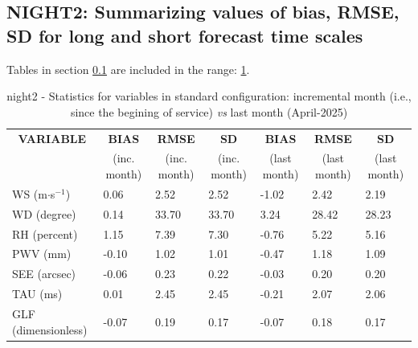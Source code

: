 \subsection{NIGHT2: Summarizing values of bias, RMSE, SD for long and short forecast time scales}\label{subsec:night2:stat}
Tables in section \ref{subsec:night2:stat} are included in the range: \ref{tab:night2:statBEF}.
\begin{table}[h!]
\begin{center}
\begin{tabular}{|l|l|l|l|l|l|l|}
\hline
\multicolumn{1}{|c|}{\cellcolor[HTML]{C0C0C0}\textbf{VARIABLE}} & \multicolumn{1}{c|}{\cellcolor[HTML]{C0C0C0}\textbf{BIAS}} & \multicolumn{1}{c|}{\cellcolor[HTML]{C0C0C0}\textbf{RMSE}} & \multicolumn{1}{c|}{\cellcolor[HTML]{C0C0C0}\textbf{SD}} & \multicolumn{1}{c|}{\cellcolor[HTML]{C0C0C0}\textbf{BIAS}} & \multicolumn{1}{c|}{\cellcolor[HTML]{C0C0C0}\textbf{RMSE}} & \multicolumn{1}{c|}{\cellcolor[HTML]{C0C0C0}\textbf{SD}}\\
\multicolumn{1}{|c|}{\cellcolor[HTML]{C0C0C0}} & \multicolumn{1}{c|}{\cellcolor[HTML]{C0C0C0}(inc. month)} & \multicolumn{1}{c|}{\cellcolor[HTML]{C0C0C0}(inc. month)} & \multicolumn{1}{c|}{\cellcolor[HTML]{C0C0C0}(inc. month)} & \multicolumn{1}{c|}{\cellcolor[HTML]{C0C0C0}(last month)} & \multicolumn{1}{c|}{\cellcolor[HTML]{C0C0C0}(last month)} & \multicolumn{1}{c|}{\cellcolor[HTML]{C0C0C0}(last month)}\\\hline
\cellcolor[HTML]{C0C0C0}WS (m$\cdot$s$^{-1}$) &      0.06  &      2.52  &      2.52  &     -1.02     &      2.42     &      2.19\\
\cellcolor[HTML]{C0C0C0}WD (degree)           &      0.14  &     33.70  &     33.70  &      3.24     &     28.42     &     28.23\\
\cellcolor[HTML]{C0C0C0}RH (percent)          &      1.15  &      7.39  &      7.30  &     -0.76     &      5.22     &      5.16\\
\cellcolor[HTML]{C0C0C0}PWV (mm)              &     -0.10 &      1.02 &      1.01 &     -0.47    &      1.18    &      1.09\\
\cellcolor[HTML]{C0C0C0}SEE (arcsec)          &     -0.06 &      0.23 &      0.22 &     -0.03    &      0.20    &      0.20\\
\cellcolor[HTML]{C0C0C0}TAU (ms)              &      0.01 &      2.45 &      2.45 &     -0.21    &      2.07    &      2.06\\
\cellcolor[HTML]{C0C0C0}GLF (dimensionless)   &     -0.07 &      0.19 &      0.17 &     -0.07    &      0.18    &      0.17\\
\hline
\end{tabular}
\caption{night2 - Statistics for variables in standard configuration: incremental month (i.e., since the begining of service) \textit{vs} last month (April-2025)}\label{tab:night2:statBEF}
\end{center}
\end{table}

